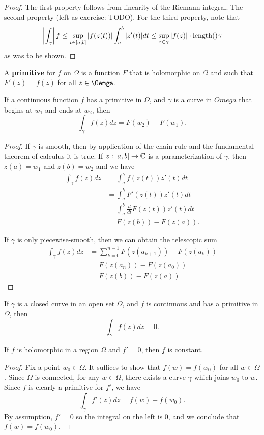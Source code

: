 \documentclass{exam}
\begin{document}
\begin{proof}
    The first property follows from linearity of the Riemann integral. The second property (left as exercise: TODO). For the third property,
    note that
    $$\left| \int_\gamma \right| f \leq \sup_{t\in[a, b]}\left| f(z(t)) \right|\int_a^b |z'(t)|dt \leq \sup_{z\in\gamma} \left| f(z) \right| \cdot \text{length}()\gamma$$
    as was to be shown.
\end{proof}

A \textbf{primitive} for $f$ on $\Omega$ is a function $F$ that is holomorphic on $\Omega$ and such that $F'(z) = f(z)$ for all $z\in\Oemga$. 
\noqed
\begin{theorem}\label{thm:main}
    If a continuous function $f$ has a primitive in $\Omega$, and $\gamma$ is a curve in $Omega$ that begins at $w_1$ and ends at $w_2$, then
    $$\int_\gamma f(z) dz = F(w_2) - F(w_1).$$
\end{theorem}
\yesqed
\begin{proof}
    If $\gamma$ is smooth, then by application of the chain rule and the fundamental theorem of calculus it is true. If $z: [a, b]\to\mathbb{C}$
    is a parameterization of $\gamma$, then $z(a) = w_1$ and $z(b) = w_2$ and we have
    \begin{align*}
        \int_\gamma f(z)dz &= \int_a^b f(z(t))z'(t)dt \\
        &= \int_a^b F'(z(t))z'(t)dt \\
        &= \int_a^b \frac{d}{dt} F(z(t))z'(t)dt \\
        &= F(z(b)) - F(z(a)).
    \end{align*}

    If $\gamma$ is only piecewise-smooth, then we can obtain the telescopic sum
    \begin{align*}
        \int_\gamma f(z)dz &= \sum_{k = 0}^{n - 1}F(z(a_{k + 1})) - F(z(a_k)) \\
        &= F(z(a_n)) - F(z(a_0)) \\
        &= F(z(b)) - F(z(a))
    \end{align*}
\end{proof}

\noqed
\begin{corollary}
    If $\gamma$ is a closed curve in an open set $\Omega$, and $f$ is continuous and has a primitive in $\Omega$, then 
    $$\int_\gamma f(z) dz = 0.$$
\end{corollary}
\begin{corollary}
    If $f$ is holomorphic in a region $\Omega$ and $f' = 0$, then $f$ is constant.
\end{corollary}
\yesqed
\begin{proof}
    Fix a point $w_0\in\Omega$. It suffices to show that $f(w) = f(w_0)$ for all $w\in\Omega$. Since $\Omega$ is connected, for any $w\in\Omega$,
    there exists a curve $\gamma$ which joins $w_0$ to $w$. Since $f$ is clearly a primitive for $f'$, we have
    $$\int_\gamma f'(z)dz = f(w) - f(w_0).$$
    By assumption, $f' = 0$ so the integral on the left is 0, and we conclude that $f(w) = f(w_0)$.
\end{proof}
\end{document}
